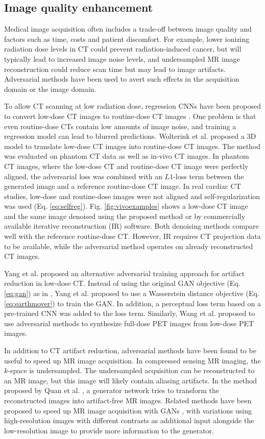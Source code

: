 \documentclass{article}
\begin{document}
\subsection{Image quality enhancement}
\label{sec:biomedquality}
Medical image acquisition often includes a trade-off between image quality and factors such as time, costs and patient discomfort. For example, lower ionizing radiation dose levels in CT could prevent radiation-induced cancer, but will typically lead to increased image noise levels, and undersampled MR image reconstruction could reduce scan time but may lead to image artifacts. Adversarial methods have been used to avert such effects in the acquisition domain or the image domain. 

To allow CT scanning at low radiation dose, regression CNNs have been proposed to convert low-dose CT images to routine-dose CT images \cite{Kang17}. One problem is that even routine-dose CTs contain low amounts of image noise, and training a regression model can lead to blurred predictions. Wolterink et al. \cite{Wolt17} proposed a 3D model to translate low-dose CT images into routine-dose CT images. The method was evaluated on phantom CT data as well as in-vivo CT images. In phantom CT images, where the low-dose CT and routine-dose CT image were perfectly aligned, the adversarial loss was combined with an $L1$-loss term between the generated image and a reference routine-dose CT image. In real cardiac CT studies, low-dose and routine-dose images were not aligned and self-regularization was used (Eq. \ref{eq:selfreg}). Fig. \ref{fig:vivoexamples} shows a low-dose CT image and the same image denoised using the proposed method or by commercially available iterative reconstruction (IR) software. Both denoising methods compare well with the reference routine-dose CT. However, IR requires CT projection data to be available, while the adversarial method operates on already reconstructed CT images. 

Yang et al. \cite{Yang18c} proposed an alternative adversarial training approach for artifact reduction in low-dose CT. Instead of using the original GAN objective (Eq. \ref{eq:gan}) as in \cite{Wolt17}, Yang et al. proposed to use a Wasserstein distance objective (Eq. \ref{eq:earthmover}) to train the GAN. In addition,  a perceptual loss term based on a pre-trained CNN was added to the loss term. Similarly, Wang et al. \cite{Wang18} proposed to use adversarial methods to synthesize full-dose PET images from low-dose PET images.

In addition to CT artifact reduction, adversarial methods have been found to be useful to speed up MR image acquisition. In compressed sensing MR imaging, the $k$-space is undersampled. The undersampled acquisition can be reconstructed to an MR image, but this image will likely contain aliasing artifacts. In the method proposed by Quan et al. \cite{Quan18}, a generator network tries to transform the reconstructed images into artifact-free MR images. Related methods have been proposed to speed up MR image acquisition with GANs \cite{Mard17,Kim18}, with variations using high-resolution images with different contrasts as additional input alongside the low-resolution image to provide more information to the generator. 
\end{document}
